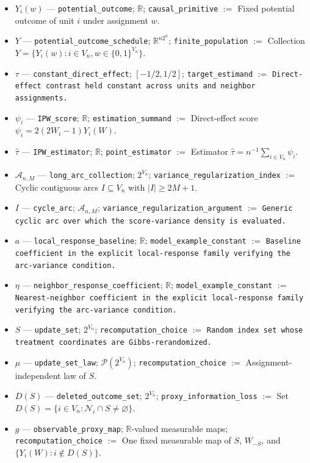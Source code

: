 \documentclass{article}
\begin{document}
\begin{itemize}
  \item \(Y_i(w)\) --- \texttt{potential\_outcome}; \(\mathbb R\); \texttt{causal\_primitive} $:=$ Fixed potential outcome of unit \(i\) under assignment \(w\).
  \item \(Y\) --- \texttt{potential\_outcome\_schedule}; \(\mathbb R^{n2^n}\); \texttt{finite\_population} $:=$ Collection \(Y=\{Y_i(w):i\in V_n,w\in\{0,1\}^{V_n}\}\).
  \item \(\tau\) --- \texttt{constant\_direct\_effect}; \([-1/2,1/2]\); \texttt{target\_estimand} $:=$ \texttt{Direct-effect contrast held constant across units and neighbor assignments.}
  \item \(\psi_i\) --- \texttt{IPW\_score}; \(\mathbb R\); \texttt{estimation\_summand} $:=$ Direct-effect score \(\psi_i=2(2W_i-1)Y_i(W)\).
  \item \(\widehat\tau\) --- \texttt{IPW\_estimator}; \(\mathbb R\); \texttt{point\_estimator} $:=$ Estimator \(\widehat\tau=n^{-1}\sum_{i\in V_n}\psi_i\).
  \item \(\mathcal A_{n,M}\) --- \texttt{long\_arc\_collection}; \(2^{V_n}\); \texttt{variance\_regularization\_index} $:=$ Cyclic contiguous arcs \(I\subseteq V_n\) with \(|I|\ge 2M+1\).
  \item \(I\) --- \texttt{cycle\_arc}; \(\mathcal A_{n,M}\); \texttt{variance\_regularization\_argument} $:=$ \texttt{Generic cyclic arc over which the score-variance density is evaluated.}
  \item \(a\) --- \texttt{local\_response\_baseline}; \(\mathbb R\); \texttt{model\_example\_constant} $:=$ \texttt{Baseline coefficient in the explicit local-response family verifying the arc-variance condition.}
  \item \(\eta\) --- \texttt{neighbor\_response\_coefficient}; \(\mathbb R\); \texttt{model\_example\_constant} $:=$ \texttt{Nearest-neighbor coefficient in the explicit local-response family verifying the arc-variance condition.}
  \item \(S\) --- \texttt{update\_set}; \(2^{V_n}\); \texttt{recomputation\_choice} $:=$ \texttt{Random index set whose treatment coordinates are Gibbs-rerandomized.}
  \item \(\mu\) --- \texttt{update\_set\_law}; \(\mathcal P(2^{V_n})\); \texttt{recomputation\_choice} $:=$ Assignment-independent law of \(S\).
  \item \(D(S)\) --- \texttt{deleted\_outcome\_set}; \(2^{V_n}\); \texttt{proxy\_information\_loss} $:=$ Set \(D(S)=\{i\in V_n:\mathcal N_i\cap S\ne\varnothing\}\).
  \item \(g\) --- \texttt{observable\_proxy\_map}; \(\mathbb R\)-valued measurable maps; \texttt{recomputation\_choice} $:=$ One fixed measurable map of \(S\), \(W_{-S}\), and \(\{Y_i(W):i\notin D(S)\}\).

\end{itemize}
\end{document}
